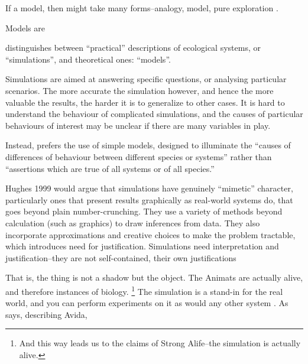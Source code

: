 
If a model, then might take many forms--analogy, model, pure exploration \autocite{Webb2009}.

Models are 

\autocite{MaynardSmith1974} distinguishes between
``practical'' descriptions of ecological systems, or ``simulations'', and
theoretical ones: ``models''.

Simulations are aimed at answering specific questions, or analysing
particular scenarios. The more accurate the simulation however, and
hence the more valuable the results, the harder it is to generalize to
other cases. It is hard to understand the behaviour of complicated
simulations, and the causes of particular behaviours of interest may be
unclear if there are many variables in play.

Instead, \autocite{MaynardSmith1974} prefers the use of simple models, designed
to illuminate the ``causes of differences of behaviour between different
species or systems'' rather than ``assertions which are true of all
systems or of all species.''

Hughes 1999 would argue that simulations have genuinely ``mimetic''
character, particularly ones that present results graphically as
real-world systems do, that goes beyond plain number-crunching. They use
a variety of methods beyond calculation (such as graphics) to draw
inferences from data. They also incorporate approximations and creative
choices to make the problem tractable, which introduces need for
justification. Simulations need interpretation and justification--they
are not self-contained, their own justifications
\autocite[31]{Winsberg2010}

\label{simulations-are-themselves-an-instance-of-the-thing}

That is, the thing is not a shadow but the object. The Animats are
actually alive, and therefore instances of biology.
\footnote{And this way leads us to the claims of Strong Alife--the simulation is actually alive.}
The simulation is a stand-in for the real world, and you can perform
experiments on it as would any other system
\autocite[31]{Winsberg2010}. As \autocite{Adami2002} says, describing
Avida,

